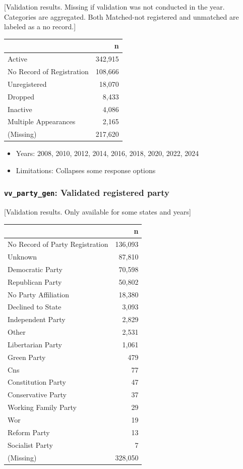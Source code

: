 \documentclass[10pt,article,oneside]{memoir}
\begin{document}
{[}Validation results. Missing if validation was not conducted in the
year. Categories are aggregated. Both Matched-not registered and
unmatched are labeled as a no record.{]}

\begin{table}[H]
\centering
\begin{tabular}[t]{lr}
\toprule
 & n\\
\midrule
Active & 342,915\\
No Record of Registration & 108,666\\
Unregistered & 18,070\\
Dropped & 8,433\\
Inactive & 4,086\\
Multiple Appearances & 2,165\\
(Missing) & 217,620\\
\bottomrule
\end{tabular}
\end{table}

\begin{itemize}
\tightlist
\item
  Years: 2008, 2010, 2012, 2014, 2016, 2018, 2020, 2022, 2024
\item
  Limitations: Collapses some response options
\end{itemize}

\subsubsection{\texorpdfstring{\texttt{vv\_party\_gen}: Validated
registered
party}{vv\_party\_gen: Validated registered party}}\label{vv_party_gen-validated-registered-party}

{[}Validation results. Only available for some states and years{]}

\begin{table}[H]
\centering
\begin{tabular}[t]{lr}
\toprule
 & n\\
\midrule
No Record of Party Registration & 136,093\\
Unknown & 87,810\\
Democratic Party & 70,598\\
Republican Party & 50,802\\
No Party Affiliation & 18,380\\
Declined to State & 3,093\\
Independent Party & 2,829\\
Other & 2,531\\
Libertarian Party & 1,061\\
Green Party & 479\\
Cns & 77\\
Constitution Party & 47\\
Conservative Party & 37\\
Working Family Party & 29\\
Wor & 19\\
Reform Party & 13\\
Socialist Party & 7\\
(Missing) & 328,050\\
\bottomrule
\end{tabular}
\end{table}
\end{document}
